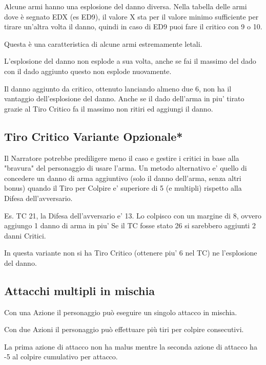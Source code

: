 \documentclass[a4paper,11pt,twoside,openany]{book}
\begin{document}
Alcune armi hanno una esplosione del danno diversa. Nella tabella delle armi dove è segnato EDX (es ED9), il valore X sta per il valore minimo sufficiente per tirare un'altra volta il danno, quindi in caso di ED9 puoi fare il critico con 9 o 10.

Questa è una caratteristica di alcune armi estremamente letali.

L'esplosione del danno non esplode a sua volta, anche se fai il massimo del dado con il dado aggiunto questo non esplode nuovamente.

Il danno aggiunto da critico, ottenuto lanciando almeno due 6, non ha il vantaggio dell'esplosione del danno. Anche se il dado dell'arma in piu' tirato grazie al Tiro Critico fa il massimo non ritiri ed aggiungi il danno.

\subsection{Tiro Critico Variante Opzionale*}

Il Narratore potrebbe prediligere meno il caso e gestire i critici in base alla "bravura" del personaggio di usare l'arma.
Un metodo alternativo e' quello di concedere un danno di arma aggiuntivo (solo il danno dell'arma, senza altri bonus) quando il Tiro per Colpire e' superiore di 5 (e multipli) rispetto alla Difesa dell'avversario.

\medskip

\begin{tcolorbox}[title = Tiro Critico Variante] 
Es. TC 21, la Difesa dell'avversario e' 13. Lo colpisco con un margine di 8, ovvero aggiungo 1 danno di arma in piu'
Se il TC fosse stato 26 si sarebbero aggiunti 2 danni Critici.
\end{tcolorbox}

In questa variante non si ha Tiro Critico (ottenere piu' 6 nel TC) ne l'esplosione del danno.


\subsection{Attacchi multipli in mischia}

Con una Azione il personaggio può eseguire un singolo attacco in mischia.

Con due Azioni il personaggio può effettuare più tiri per colpire consecutivi.

La prima azione di attacco non ha malus mentre la seconda azione di attacco ha -5 al colpire cumulativo per attacco.
\end{document}

